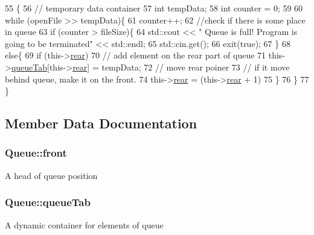 \begin{DoxyCode}
55                                                  \{
56     \textcolor{comment}{// temporary data container}
57     \textcolor{keywordtype}{int} tempData;
58     \textcolor{keywordtype}{int} counter = 0;
59 
60     \textcolor{keywordflow}{while} (openFile >> tempData)\{
61         counter++;
62         \textcolor{comment}{//check if there is some place in queue}
63         \textcolor{keywordflow}{if} (counter > fileSize)\{
64             std::cout << \textcolor{stringliteral}{" Queue is full! Program is going to be terminated"} << std::endl;
65             std::cin.get();
66             exit(\textcolor{keyword}{true});
67         \}
68         \textcolor{keywordflow}{else}\{
69             \textcolor{keywordflow}{if} (this->\hyperlink{class_queue_ac09196d6d91d62b8547bae02ae9063c5}{rear})
70                 \textcolor{comment}{// add element on the rear part of queue}
71                 this->\hyperlink{class_queue_a8e206ea3eba2e59137f36b4425761a1d}{queueTab}[this->\hyperlink{class_queue_ac09196d6d91d62b8547bae02ae9063c5}{rear}] = tempData;
72             \textcolor{comment}{// move rear poiner}
73             \textcolor{comment}{// if it move behind queue, make it on the front.}
74             this->\hyperlink{class_queue_ac09196d6d91d62b8547bae02ae9063c5}{rear} = (this->\hyperlink{class_queue_ac09196d6d91d62b8547bae02ae9063c5}{rear} + 1) %
75         \}
76     \}
77 \}\end{DoxyCode}


\subsection{Member Data Documentation}
\hypertarget{class_queue_a6d40dfb591ad9ff13fd1084b9e1eb0d5}{}
\subsubsection[{front}]{\setlength{\rightskip}{0pt plus 5cm}Queue\+::front\hspace{0.3cm}{\ttfamily [private]}}\label{class_queue_a6d40dfb591ad9ff13fd1084b9e1eb0d5}
A head of queue position \hypertarget{class_queue_a8e206ea3eba2e59137f36b4425761a1d}{}
\subsubsection[{queue\+Tab}]{\setlength{\rightskip}{0pt plus 5cm}Queue\+::queue\+Tab\hspace{0.3cm}{\ttfamily [private]}}\label{class_queue_a8e206ea3eba2e59137f36b4425761a1d}
A dynamic container for elements of queue \hypertarget{class_queue_ac09196d6d91d62b8547bae02ae9063c5}{}

